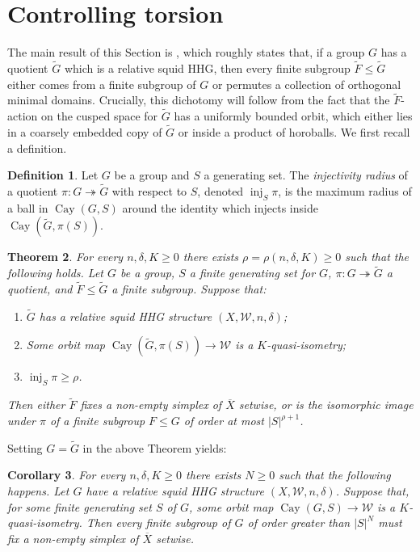 \documentclass[svgnames]{amsart}
\theoremstyle{plain}
\newtheorem{thm}{Theorem}[section]
\newtheorem{cor}[thm]{Corollary}
\theoremstyle{definition}
\newtheorem{defn}[thm]{Definition}
\newcommand{\W}{\mathcal{W}}
\newcommand{\squid}[1]{squid}
\newcommand{\Cay}[2]{\operatorname{Cay}\left(#1,#2\right)}
\newcommand{\inj}[2]{\operatorname{inj}_{#2}{#1}}
\newcommand{\ov}[1]{\overline{#1}}
\begin{document}
\section{Controlling torsion}\label{sec:control_torsion}
The main result of this Section is , which roughly states that, if a group $G$ has a quotient $\widetilde G$ which is a relative \squid{} HHG, then every finite subgroup $\widetilde F\le \widetilde G$ either comes from a finite subgroup of $G$ or permutes a collection of orthogonal minimal domains. Crucially, this dichotomy will follow from the fact that the $\widetilde F$-action on the cusped space for $\widetilde G$ has a uniformly bounded orbit, which either lies in a coarsely embedded copy of $\widetilde G$ or inside a product of horoballs. We first recall a definition.
\begin{defn}
    Let $G$ be a group and $S$ a generating set. The \emph{injectivity radius} of a quotient $\pi\colon G\twoheadrightarrow \widetilde{G}$ with respect to $S$, denoted $\inj{\pi}{S}$, is the maximum radius of a ball in $\Cay{G}{S}$ around the identity which injects inside $\Cay{\widetilde{G}}{\pi(S)}$. 
\end{defn}

\begin{thm}\label{thm:torsion-of_quot} For every $n,\delta,K\ge 0$ there exists $\rho=\rho(n,\delta,K)\ge 0$ such that the following holds.
Let $G$ be a group, $S$ a finite generating set for $G$, $\pi\colon G\twoheadrightarrow \widetilde{G}$ a quotient, and $\widetilde{F}\le \widetilde{G}$ a finite subgroup. Suppose that:
\begin{enumerate}
    \item $\widetilde{G}$ has a relative \squid{} HHG structure $(X,\W,n,\delta)$;
    \item Some orbit map $\Cay{\widetilde{G}}{\pi(S)}\to \W$ is a $K$-quasi-isometry;
    \item $\inj{\pi}{S}\ge \rho$.
\end{enumerate}
Then either $\widetilde F$ fixes a non-empty simplex of $\ov X$ setwise, or is the isomorphic image under $\pi$ of a finite subgroup $F\le G$ of order at most $|S|^{\rho+1}$.
\end{thm}

\noindent Setting $G=\widetilde{G}$ in the above Theorem yields:
\begin{cor}\label{cor:Nielsen_realisation} For every $n,\delta,K\ge 0$ there exists $N\ge 0$ such that the following happens.
Let $G$ have a relative \squid{} HHG structure $(X,\W,n,\delta)$. Suppose that, for some finite generating set $S$ of $G$, some orbit map $\Cay{G}{S}\to\W$ is a $K$-quasi-isometry. Then every finite subgroup of $G$ of order greater than $|S|^N$ must fix a non-empty simplex of $\ov X$ setwise. 
\end{cor}
\end{document}
